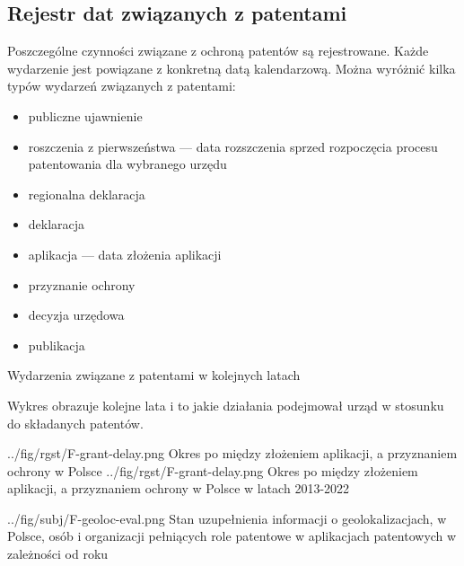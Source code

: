   \newpage\subsection
{Rejestr dat związanych z patentami}

Poszczególne czynności związane z ochroną patentów są rejestrowane.
Każde wydarzenie jest powiązane z konkretną datą kalendarzową.
Można wyróżnić kilka typów wydarzeń związanych z patentami:

  \begin{itemize}

\item
publiczne ujawnienie 


\item
roszczenia z pierwszeństwa  --- 
data rozszczenia sprzed rozpoczęcia procesu patentowania dla wybranego urzędu


\item
regionalna deklaracja 


\item
deklaracja 


\item
aplikacja  --- data złożenia aplikacji


\item
przyznanie ochrony 


\item
decyzja urzędowa


\item
publikacja
\end{itemize}



  \newpage
{}
{Wydarzenia związane z patentami w kolejnych latach}

Wykres obrazuje kolejne lata i to jakie
działania podejmował urząd w stosunku do składanych patentów.



  \newpage
\figsides
{../fig/rgst/F-grant-delay.png}
{Okres po między złożeniem aplikacji, a przyznaniem ochrony w Polsce}
{../fig/rgst/F-grant-delay.png}
{ Okres po między złożeniem aplikacji, a przyznaniem ochrony w Polsce 
  w latach 2013-2022 }



\figside
{../fig/subj/F-geoloc-eval.png}
{ Stan uzupełnienia informacji o geolokalizacjach, w Polsce, 
  osób i organizacji pełniących role patentowe
  w aplikacjach patentowych w zależności od roku}









